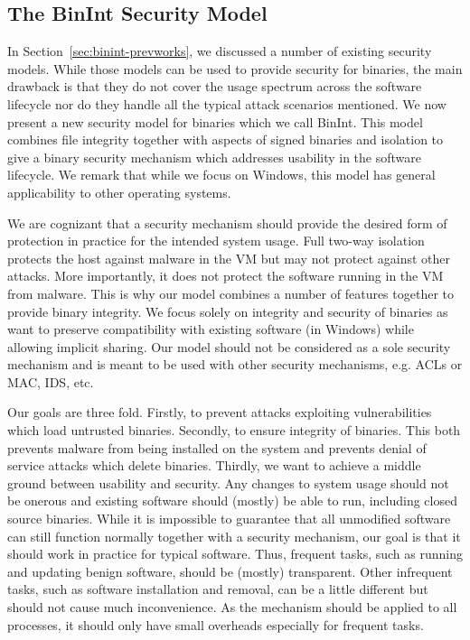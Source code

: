 \subsection{The BinInt Security Model}
\label{sec:binint-model}

In Section~\ref{sec:binint-prevworks}, we discussed a number of existing
security models. While those models can be used to provide security
for binaries, the main drawback is that they do not cover the usage spectrum
across the software lifecycle nor do they handle all the
typical attack scenarios mentioned.
We now present a new security model for binaries
which we call BinInt.
This model combines file integrity together with
aspects of signed binaries and isolation to give a binary
security mechanism which
addresses usability in the software lifecycle. We remark
that while we focus on Windows, this model has general applicability
to other operating systems.

We are cognizant that a security mechanism
should provide the desired form of protection in practice for
the intended system usage.
Full two-way isolation protects the host
against malware in the VM but may not
protect against other attacks.
More importantly, it does not protect the software running
in the VM from malware.
This is why our model combines a number of features together to provide
binary integrity.
We focus solely on integrity and security of binaries
as want to preserve compatibility with existing
software (in Windows) while allowing implicit sharing.
Our model should not be considered as a sole security mechanism and
is meant to be used with other security mechanisms,
e.g. ACLs or MAC, IDS, etc.

Our goals are three fold.
Firstly, to prevent attacks exploiting vulnerabilities which load
untrusted binaries.
Secondly, to ensure integrity of binaries.
This both prevents malware from being installed on the system and
prevents denial of service attacks which delete binaries.
Thirdly, we want to achieve a middle ground
between usability and security.
Any changes to system usage should not be onerous and existing software
should (mostly) be able to run, including closed source binaries.
While it is impossible to guarantee that all unmodified software can still
function normally together with a security mechanism, our goal is that
it should work in practice for typical software.
Thus, frequent tasks, such as running and updating benign software,
should be (mostly) transparent.
Other infrequent tasks, such as software installation and removal,
can be a little different but should not cause much inconvenience.
As the mechanism should be applied to all processes,
it should only have small overheads especially for frequent tasks.

